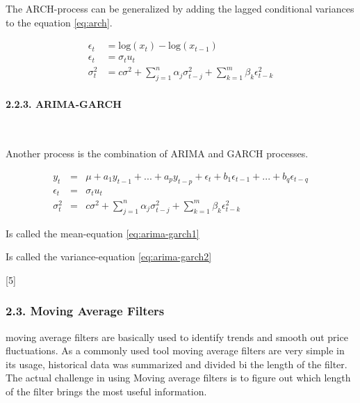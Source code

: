 \documentclass[
]{article}
\begin{document}
The ARCH-process can be generalized by adding the lagged conditional
variances to the equation \ref{eq:arch}.

\begin{align} \label{eq:garch}
  \epsilon_{t} &= \mathrm{log}(x_{t})-\mathrm{log}(x_{t-1}) \nonumber \\
  \epsilon_{t} &= \sigma_{t}u_{t} \\
  \sigma_{t}^{2} &=c \sigma^{2}+\sum_{j=1}^{n}\alpha_{j}\sigma_{t-j}^{2}+\sum_{k=1}^{m}\beta_{k}\epsilon_{t-k}^{2} \nonumber
\end{align}

\hypertarget{arima-garch}{%
\paragraph{2.2.3. ARIMA-GARCH}\label{arima-garch}}

~

Another process is the combination of ARIMA and GARCH processes.

\begin{eqnarray}
y_{t}&=&\mu + a_{1}y_{t-1}+...+a_{p}y_{t-p}+\epsilon_{t}+b_{1}\epsilon_{t-1}+...+b_{q}\epsilon_{t-q} \label{eq:arima-garch1} \\
\epsilon_{t}&=&\sigma_{t}u_{t} \nonumber \\
\sigma_{t}^{2}&=&c\sigma^{2}+\sum_{j=1}^{n}\alpha_{j}\sigma_{t-j}^{2}+\sum_{k=1}^{m}\beta_{k}\epsilon_{t-k}^{2} \label{eq:arima-garch2}
\end{eqnarray}

Is called the mean-equation \ref{eq:arima-garch1}

Is called the variance-equation \ref{eq:arima-garch2}

{[}5{]}

\newpage

\hypertarget{moving-average-filters}{%
\subsubsection{2.3. Moving Average
Filters}\label{moving-average-filters}}

moving average filters are basically used to identify trends and smooth
out price fluctuations. As a commonly used tool moving average filters
are very simple in its usage, historical data was summarized and divided
bi the length of the filter. The actual challenge in using Moving
average filters is to figure out which length of the filter brings the
most useful information.
\end{document}
